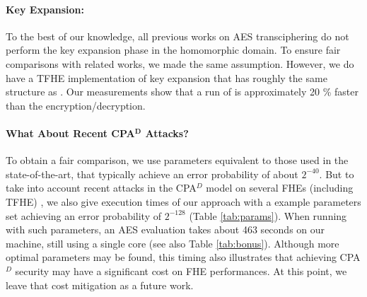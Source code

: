 


\paragraph{Key Expansion:} To the best of our knowledge, all previous works on AES transciphering do not perform the key expansion phase in the homomorphic domain. To ensure fair comparisons with related works, we made the same assumption. However, we do have a TFHE implementation of key expansion that has roughly the same structure as \hippo. Our measurements show that a run of \KeyExpansion is approximately 20 \% faster than the encryption/decryption. 



\paragraph{What About Recent CPA$^\mathbf{D}$ Attacks?}
To obtain a fair comparison, we use parameters equivalent to those used in the state-of-the-art, that typically achieve an error probability of about $2^{-40}$. But to take into account recent attacks in the CPA$^D$ model \cite{EC:LiMic21} on several FHEs (including TFHE) \cite{C:CSBB24, CCS:CCPSS24}, we also give execution times of our approach with a example parameters set achieving an error probability of $2^{-128}$ (Table \ref{tab:params}). When running with such parameters, an AES evaluation takes about 463 seconds on our machine, still using a single core (see also Table \ref{tab:bonus}). Although more optimal parameters may be found, this timing also illustrates that achieving CPA$^{D}$ security may have a significant cost on FHE performances. At this point, we leave that cost mitigation as a future work.


